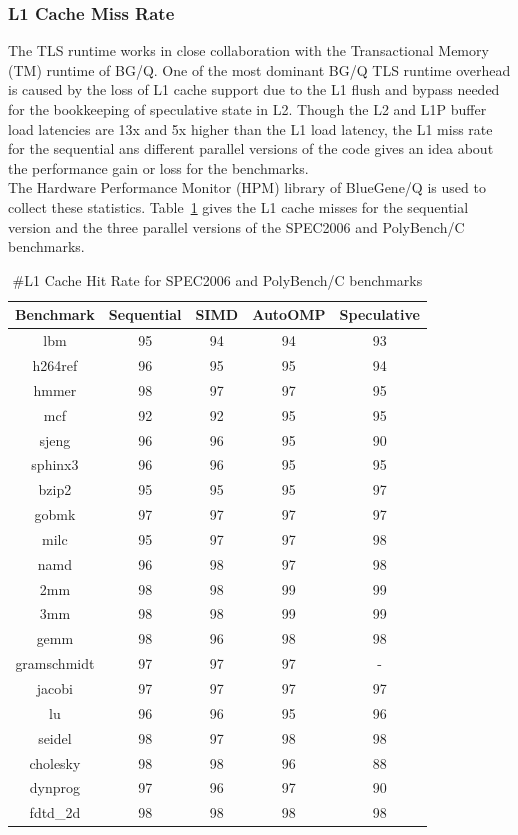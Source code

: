 \documentclass[10pt]{report}          %
\begin{document}
\subsubsection{L1 Cache Miss Rate}

The TLS runtime works in close collaboration with the Transactional Memory (TM) runtime of BG/Q.  One of the most dominant BG/Q TLS runtime overhead is caused by the loss of L1 cache support due to the L1 flush and bypass needed for the bookkeeping of speculative
state in L2. Though the L2 and L1P buffer load latencies are 13x and 5x higher than the L1 load latency, the L1 miss rate for the sequential ans different parallel versions of the code gives an idea about the performance gain or loss for the benchmarks.\\
The Hardware Performance Monitor (HPM) library of BlueGene/Q is used to collect these statistics. Table~\ref{table:cache} gives the L1 cache misses for the sequential version and the three parallel versions of the SPEC2006 and PolyBench/C benchmarks.\\

\begin{table}[h]
\centering
\caption{\#L1 Cache Hit Rate for SPEC2006 and PolyBench/C benchmarks}
\begin{tabular}{|c||c|c|c|c|} \hline
Benchmark &Sequential & SIMD & AutoOMP & Speculative\\ \hline 
lbm & 95 & 94 & 94 & 93\\ \hline
h264ref & 96 & 95 & 95 & 94 \\ \hline
hmmer &	98 & 97 & 97 & 95  \\ \hline
mcf & 92 & 92 & 95 & 95 \\ \hline
sjeng &	96 & 96 & 95 & 90 \\ \hline
sphinx3 & 96 & 96 & 95 & 95  \\ \hline
bzip2 & 95 & 95 & 95 & 97  \\ \hline
gobmk & 97 & 97 & 97 & 97  \\ \hline
milc & 95 & 97 & 97 & 98  \\ \hline
namd & 96 & 98 & 97 & 98  \\ \hline
2mm	& 98 & 98 & 99 & 99 \\ \hline
3mm	& 98 & 98 & 99 & 99 \\ \hline
gemm	 & 98 & 96 & 98 & 98\\ \hline
gramschmidt	& 97 & 97 & 97 & - \\ \hline
jacobi & 97& 97 & 97 & 97 \\ \hline
lu	& 96 & 96 & 95 & 96 \\ \hline
seidel&	98 & 97 & 98 & 98 \\ \hline
cholesky & 98 & 98 & 96 & 88\\ \hline
dynprog & 97 & 96 & 97 & 90\\ \hline
fdtd\_2d & 98 & 98 & 98 & 98 \\ \hline
\hline\end{tabular}
\label{table:cache}
\end{table}
\end{document}
